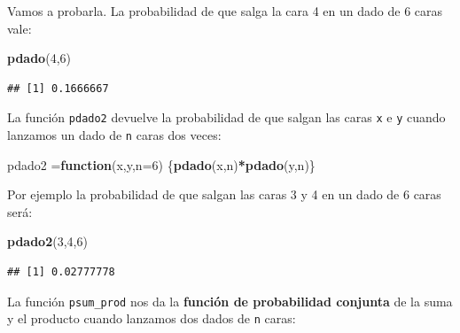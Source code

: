 \documentclass[]{book}
\newenvironment{Shaded}{\begin{snugshade}}{\end{snugshade}}
\newcommand{\ControlFlowTok}[1]{\textcolor[rgb]{0.13,0.29,0.53}{\textbf{#1}}}
\newcommand{\DataTypeTok}[1]{\textcolor[rgb]{0.13,0.29,0.53}{#1}}
\newcommand{\DecValTok}[1]{\textcolor[rgb]{0.00,0.00,0.81}{#1}}
\newcommand{\KeywordTok}[1]{\textcolor[rgb]{0.13,0.29,0.53}{\textbf{#1}}}
\newcommand{\NormalTok}[1]{#1}
\newcommand{\OperatorTok}[1]{\textcolor[rgb]{0.81,0.36,0.00}{\textbf{#1}}}
\begin{document}
Vamos a probarla. La probabilidad de que salga la cara 4 en un dado de 6 caras vale:

\begin{Shaded}
\begin{Highlighting}[]
\KeywordTok{pdado}\NormalTok{(}\DecValTok{4}\NormalTok{,}\DecValTok{6}\NormalTok{)}
\end{Highlighting}
\end{Shaded}

\begin{verbatim}
## [1] 0.1666667
\end{verbatim}

La función \texttt{pdado2} devuelve la probabilidad de que salgan las caras \texttt{x} e \texttt{y} cuando lanzamos un dado de \texttt{n} caras dos veces:

\begin{Shaded}
\begin{Highlighting}[]
\NormalTok{pdado2 =}\ControlFlowTok{function}\NormalTok{(x,y,}\DataTypeTok{n=}\DecValTok{6}\NormalTok{) \{}\KeywordTok{pdado}\NormalTok{(x,n)}\OperatorTok{*}\KeywordTok{pdado}\NormalTok{(y,n)\}}
\end{Highlighting}
\end{Shaded}

Por ejemplo la probabilidad de que salgan las caras 3 y 4 en un dado de 6 caras será:

\begin{Shaded}
\begin{Highlighting}[]
\KeywordTok{pdado2}\NormalTok{(}\DecValTok{3}\NormalTok{,}\DecValTok{4}\NormalTok{,}\DecValTok{6}\NormalTok{)}
\end{Highlighting}
\end{Shaded}

\begin{verbatim}
## [1] 0.02777778
\end{verbatim}

La función \texttt{psum\_prod} nos da la \textbf{función de probabilidad conjunta} de la suma y el producto cuando lanzamos dos dados de \texttt{n} caras:
\end{document}
